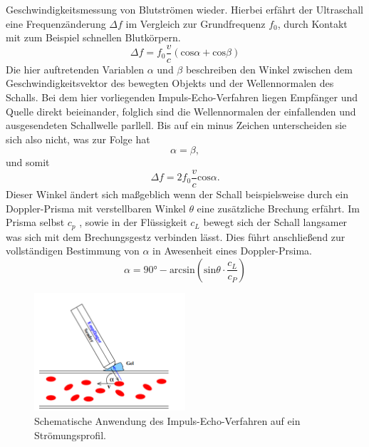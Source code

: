 Geschwindigkeitsmessung von Blutströmen wieder. Hierbei erfährt der Ultraschall eine Frequenzänderung $\Delta f$ im Vergleich zur Grundfrequenz $f_0$,
durch Kontakt mit zum Beispiel schnellen Blutkörpern. 
\begin{equation*}
  \Delta f = f_0 \frac{v}{c} \left ( \text{cos}\alpha + \text{cos}\beta \right )
\end{equation*}
Die hier auftretenden Variablen $\alpha$ und $\beta$ beschreiben den Winkel zwischen dem Geschwindigkeitsvektor des bewegten Objekts
und der Wellennormalen des Schalls. Bei dem hier vorliegenden Impuls-Echo-Verfahren liegen Empfänger und Quelle direkt beieinander, folglich sind 
die Wellennormalen der einfallenden und ausgesendeten Schallwelle parllell. Bis auf ein minus Zeichen unterscheiden sie sich also nicht, was zur Folge hat
\begin{equation*}
    \alpha = \beta,
\end{equation*}
und somit
\begin{equation}
    \label{eqn:deltaf}
    \Delta f = 2 f_0 \frac{v}{c} \text{cos}\alpha.
\end{equation}
Dieser Winkel ändert sich maßgeblich wenn der Schall beispielsweise durch ein Doppler-Prisma mit verstellbaren Winkel $\theta$ eine zusätzliche Brechung erfährt.
Im Prisma selbst $c_p$ \cite{....}, sowie in der Flüssigkeit $c_L$ \cite{....} bewegt sich der Schall  langsamer  was sich mit dem Brechungsgestz verbinden lässt. Dies 
führt anschließend zur vollständigen Bestimmung von $\alpha$ in Awesenheit eines Doppler-Prsima. 
\begin{equation}
    \label{eqn:alphafinal}
    \alpha = 90 \si{\degree} - \text{arcsin} \left( \text{sin}\theta \cdot \frac{c_L}{c_P} \right)
\end{equation}

\begin{figure}
    \centering
    \includegraphics[width=0.5\textwidth]{bilder/winkel.png}
    \caption{Schematische Anwendung des Impuls-Echo-Verfahren auf ein Strömungsprofil. \cite{skript}} 
    \label{fig:figskizze1}
\end{figure}


